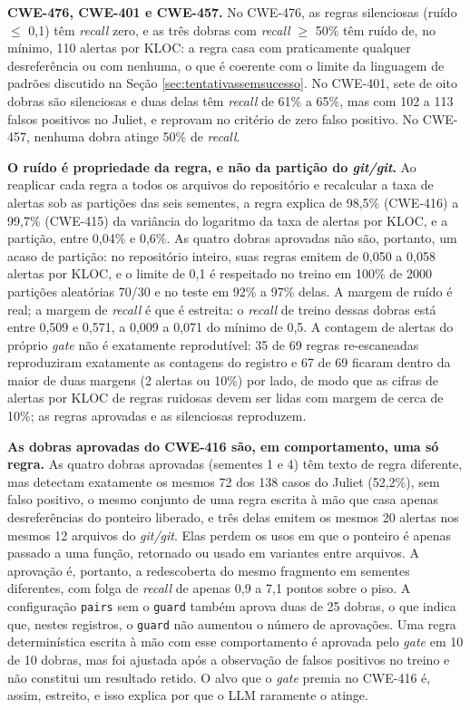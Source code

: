 \documentclass[
    12pt,                %
    openright,           %
    oneside,             %
    a4paper,             %
    english,             %
    brazil               %
]{abntex2}
\newcommand{\novo}[1]{{\color{red}#1}}
\begin{document}
\novo{\textbf{CWE-476, CWE-401 e CWE-457.} No CWE-476, as regras silenciosas (ruído $\leq$ 0,1) têm \textit{recall} zero, e as três dobras com \textit{recall} $\geq$ 50\% têm ruído de, no mínimo, 110 alertas por KLOC: a regra casa com praticamente qualquer desreferência ou com nenhuma, o que é coerente com o limite da linguagem de padrões discutido na Seção \ref{sec:tentativassemsucesso}. No CWE-401, sete de oito dobras são silenciosas e duas delas têm \textit{recall} de 61\% a 65\%, mas com 102 a 113 falsos positivos no Juliet, e reprovam no critério de zero falso positivo. No CWE-457, nenhuma dobra atinge 50\% de \textit{recall}.}
\par
\novo{\textbf{O ruído é propriedade da regra, e não da partição do \textit{git/git}.} Ao reaplicar cada regra a todos os arquivos do repositório e recalcular a taxa de alertas sob as partições das seis sementes, a regra explica de 98,5\% (CWE-416) a 99,7\% (CWE-415) da variância do logaritmo da taxa de alertas por KLOC, e a partição, entre 0,04\% e 0,6\%. As quatro dobras aprovadas não são, portanto, um acaso de partição: no repositório inteiro, suas regras emitem de 0,050 a 0,058 alertas por KLOC, e o limite de 0,1 é respeitado no treino em 100\% de 2000 partições aleatórias 70/30 e no teste em 92\% a 97\% delas. A margem de ruído é real; a margem de \textit{recall} é que é estreita: o \textit{recall} de treino dessas dobras está entre 0,509 e 0,571, a 0,009 a 0,071 do mínimo de 0,5. A contagem de alertas do próprio \textit{gate} não é exatamente reprodutível: 35 de 69 regras re-escaneadas reproduziram exatamente as contagens do registro e 67 de 69 ficaram dentro da maior de duas margens (2 alertas ou 10\%) por lado, de modo que as cifras de alertas por KLOC de regras ruidosas devem ser lidas com margem de cerca de 10\%; as regras aprovadas e as silenciosas reproduzem.}
\par
\novo{\textbf{As dobras aprovadas do CWE-416 são, em comportamento, uma só regra.} As quatro dobras aprovadas (sementes 1 e 4) têm texto de regra diferente, mas detectam exatamente os mesmos 72 dos 138 casos do Juliet (52,2\%), sem falso positivo, o mesmo conjunto de uma regra escrita à mão que casa apenas desreferências do ponteiro liberado, e três delas emitem os mesmos 20 alertas nos mesmos 12 arquivos do \textit{git/git}. Elas perdem os usos em que o ponteiro é apenas passado a uma função, retornado ou usado em variantes entre arquivos. A aprovação é, portanto, a redescoberta do mesmo fragmento em sementes diferentes, com folga de \textit{recall} de apenas 0,9 a 7,1 pontos sobre o piso. A configuração \texttt{pairs} sem o \texttt{guard} também aprova duas de 25 dobras, o que indica que, nestes registros, o \texttt{guard} não aumentou o número de aprovações. Uma regra determinística escrita à mão com esse comportamento é aprovada pelo \textit{gate} em 10 de 10 dobras, mas foi ajustada após a observação de falsos positivos no treino e não constitui um resultado retido. O alvo que o \textit{gate} premia no CWE-416 é, assim, estreito, e isso explica por que o LLM raramente o atinge.}
\end{document}
